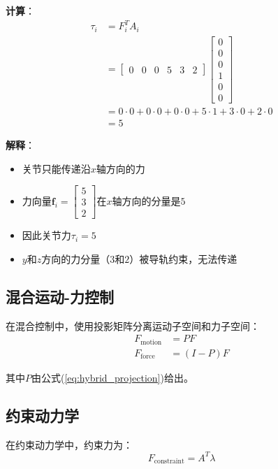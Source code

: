 \documentclass[12pt,a4paper]{article}
\begin{document}
\textbf{计算}：
\begin{align}
\tau_i &= F_i^T A_i \\
&= \begin{bmatrix} 0 & 0 & 0 & 5 & 3 & 2 \end{bmatrix} \begin{bmatrix} 0 \\ 0 \\ 0 \\ 1 \\ 0 \\ 0 \end{bmatrix} \\
&= 0 \cdot 0 + 0 \cdot 0 + 0 \cdot 0 + 5 \cdot 1 + 3 \cdot 0 + 2 \cdot 0 \\
&= 5
\end{align}

\textbf{解释}：
\begin{itemize}
\item 关节只能传递沿$x$轴方向的力
\item 力向量$\bm{f}_i = \begin{bmatrix} 5 \\ 3 \\ 2 \end{bmatrix}$在$x$轴方向的分量是$5$
\item 因此关节力$\tau_i = 5$
\item $y$和$z$方向的力分量（$3$和$2$）被导轨约束，无法传递
\end{itemize}

\subsection{混合运动-力控制}

在混合控制中，使用投影矩阵分离运动子空间和力子空间：
\begin{align}
F_{\text{motion}} &= P F \\
F_{\text{force}} &= (I - P) F
\end{align}

其中$P$由公式(\ref{eq:hybrid_projection})给出。

\subsection{约束动力学}

在约束动力学中，约束力为：
\begin{equation}
F_{\text{constraint}} = A^T \lambda
\end{equation}
\end{document}
